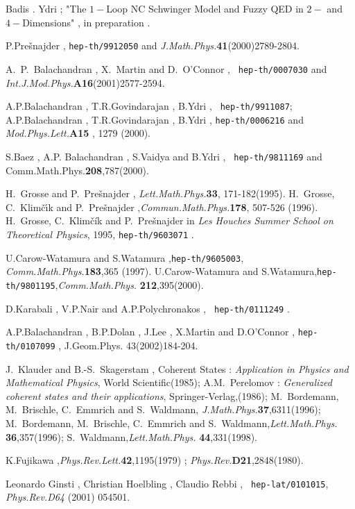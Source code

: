 \documentclass[a4paper,10pt]{article}
\begin{document}
\begin{thebibliography}{99}
Badis . Ydri ; "The $1-$Loop NC Schwinger Model and Fuzzy QED in $2-$ and $4-$Dimensions" , in preparation .

P.Pre\v{s}najder , {\tt hep-th/9912050} and {\em
J.Math.Phys.}{\bf 41}(2000)2789-2804.




A.~P.~Balachandran , X.~Martin and D.~O'Connor , {\tt
hep-th/0007030} and {\em Int.J.Mod.Phys.}{\bf A16}(2001)2577-2594.

A.P.Balachandran , T.R.Govindarajan , B.Ydri , {\tt
hep-th/9911087}; A.P.Balachandran , T.R.Govindarajan , B.Ydri ,
{\tt hep-th/0006216} and {\em Mod.Phys.Lett.}{\bf A15} , 1279
(2000).

S.Baez , A.P. Balachandran , S.Vaidya and B.Ydri , {\tt
hep-th/9811169} and Comm.Math.Phys.{\bf 208},787(2000).


H.~Grosse and P.~Pre\v{s}najder , {\em Lett.Math.Phys.}{\bf 33},
171-182(1995). H.~Grosse, C.~Klim\v{c}\'{\i}k and
P.~Pre\v{s}najder ,{\em Commun.Math.Phys.}{\bf 178}, 507-526
(1996). H.~Grosse, C.~Klim\v{c}\'{i}k and P.~Pre\v{s}najder in
{\em Les Houches Summer School on Theoretical Physics}, 1995,
{\tt hep-th/9603071} .


U.Carow-Watamura and S.Watamura ,{\tt hep-th/9605003},{\em
Comm.Math.Phys.}{\bf 183},365 (1997). U.Carow-Watamura and
S.Watamura,{\tt hep-th/9801195},{\em Comm.Math.Phys.} {\bf
212},395(2000).

D.Karabali , V.P.Nair and A.P.Polychronakos , {\tt
hep-th/0111249} .

A.P.Balachandran , B.P.Dolan , J.Lee , X.Martin and D.O'Connor ,
{\tt hep-th/0107099} , J.Geom.Phys. 43(2002)184-204.

J.~Klauder and B.-S.~Skagerstam , Coherent States : {\em
Application in Physics and Mathematical Physics}, World
Scientific(1985); A.M.~Perelomov : {\em Generalized coherent
states and their applications}, Springer-Verlag,(1986);
M.~Bordemann, M.~Brischle, C.~Emmrich and S.~Waldmann,{\em
J.Math.Phys.}{\bf 37},6311(1996); M.~Bordemann, M.~Brischle,
C.~Emmrich and S.~Waldmann,{\em Lett.Math.Phys.}{\bf
36},357(1996); S.~Waldmann,{\em Lett.Math.Phys.}{\bf
44},331(1998).

K.Fujikawa ,{\em Phys.Rev.Lett.}{\bf 42},1195(1979) ; {\em
Phys.Rev.}{\bf D21},2848(1980).

Leonardo Ginsti , Christian Hoelbling , Claudio Rebbi , {\tt
hep-lat/0101015}, {\em Phys.Rev.D64} (2001) 054501.



\end{thebibliography}
\end{document}
